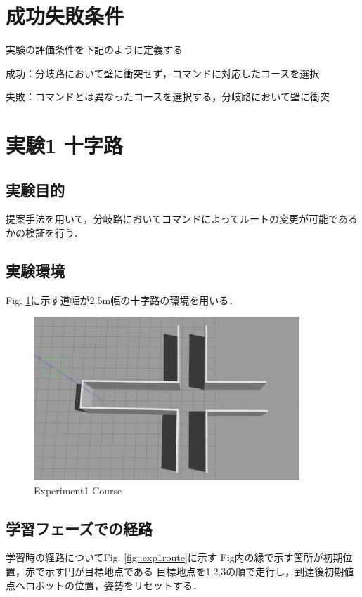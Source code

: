\section{成功失敗条件}
実験の評価条件を下記のように定義する

成功：分岐路において壁に衝突せず，コマンドに対応したコースを選択

失敗：コマンドとは異なったコースを選択する，分岐路において壁に衝突

\newpage
\section{実験1 十字路}
\subsection{実験目的}
提案手法を用いて，分岐路においてコマンドによってルートの変更が可能であるかの検証を行う．
\subsection{実験環境}
Fig. \ref{fig::zyuzi}に示す道幅が2.5m幅の十字路の環境を用いる．
\begin{figure}[ht]
    \centering
    \includegraphics[width = 10cm]{./figs/zyuuziyoko.png}
    \caption{Experiment1 Course}
    \label{fig::zyuzi}
\end{figure}

\newpage
\subsection{学習フェーズでの経路}
学習時の経路についてFig. \ref{fig::exp1route}に示す
Fig内の緑で示す箇所が初期位置，赤で示す円が目標地点である
目標地点を1,2,3の順で走行し，到達後初期値点へロボットの位置，姿勢をリセットする．

